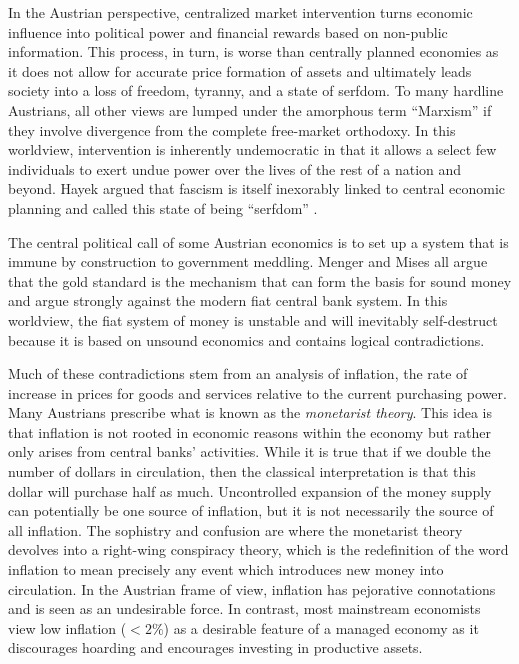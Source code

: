 In the Austrian perspective, centralized market intervention turns economic
influence into political power and financial rewards based on non-public
information. This process, in turn, is worse than centrally planned economies as
it does not allow for accurate price formation of assets and ultimately leads
society into a loss of freedom, tyranny, and a state of serfdom. To many
hardline Austrians, all other views are lumped under the amorphous term
``Marxism'' if they involve divergence from the complete free-market orthodoxy. In
this worldview, intervention is inherently undemocratic in that it allows a
select few individuals to exert undue power over the lives of the rest of a
nation and beyond. Hayek argued that fascism is itself inexorably linked to
central economic planning and called this state of being ``serfdom''
\cite{golumbia_bitcoin_2015, golumbia_cyberlibertarianism_2013}.


The central political call of some Austrian economics is to set up a system that
is immune by construction to government meddling. Menger and Mises all argue
that the gold standard is the mechanism that can form the basis for sound money
and argue strongly against the modern fiat central bank system. In this
worldview, the fiat system of money is unstable and will inevitably
self-destruct because it is based on unsound economics and contains logical
contradictions.

Much of these contradictions stem from an analysis of inflation, the rate of
increase in prices for goods and services relative to the current purchasing
power. Many Austrians prescribe what is known as the \textit{monetarist theory}.
This idea is that inflation is not rooted in economic reasons within the economy
but rather only arises from central banks' activities. While it is true that if
we double the number of dollars in circulation, then the classical
interpretation is that this dollar will purchase half as much. Uncontrolled
expansion of the money supply can potentially be one source of inflation, but it
is not necessarily the source of all inflation. \cite{frisch_theories_1983} The
sophistry and confusion are where the monetarist theory devolves into a
right-wing conspiracy theory, which is the redefinition of the word inflation to
mean precisely any event which introduces new money into circulation. In the
Austrian frame of view, inflation has pejorative connotations and is seen as an
undesirable force. In contrast, most mainstream economists view low inflation
($<2\%$) as a desirable feature of a managed economy as it discourages hoarding
and encourages investing in productive assets.

